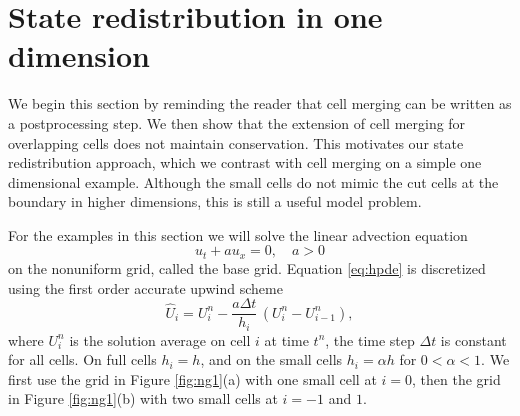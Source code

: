 \section{State redistribution in one dimension} \label{sec:srd1d}
We begin this section  by reminding the reader that cell merging can
be written as a postprocessing step. We then show that the extension of
cell merging for overlapping cells does not maintain conservation. 
This motivates our state redistribution approach, which we contrast with
cell merging on a simple one dimensional example. 
Although the small cells do not mimic the cut cells at the 
boundary in higher dimensions, this is still a useful model problem. 

For the examples in this section we will solve the linear advection equation
\begin{equation}\label{eq:hpde}
u_t + au_x = 0, \quad a>0
\end{equation}
on the nonuniform grid, called the base grid. Equation \eqref{eq:hpde} is
discretized  using the  first order
accurate upwind scheme 
\begin{equation}\label{eq:unstable1d}
\widehat{U}_i = U^n_i - \frac{a \Delta t} {h_i} \, (U^n_i -U^n_{i-1}),
\end{equation}
where $U^n_i$ is the solution average on cell $i$ at time $t^n$, the time
step $\Delta t$ is constant for all cells. On full cells $h_i = h$, and on
the small cells  $h_i = \alpha h$ for $ 0 < \alpha < 1$.
We first use
the grid in Figure \ref{fig:ng1}(a) with one small cell at $i=0$, then the grid
in Figure \ref{fig:ng1}(b) with two small cells at $i = -1$ and $1$.

